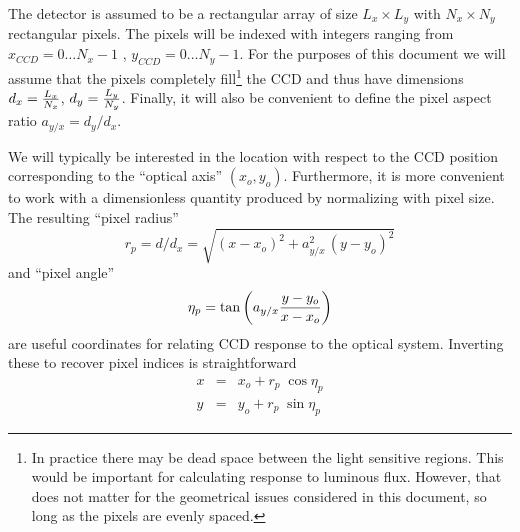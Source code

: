 \documentclass[11pt,twoside]{article}   %
\begin{document}
The detector is assumed to be a rectangular array of size $L_x
\times L_y$ with $N_x \times N_y$ rectangular pixels.  The pixels
will be indexed with integers ranging from $x_{CCD} = 0\ldots
N_x-1$ , $y_{CCD} = 0\ldots N_y-1$. For the purposes of this
document we will assume that the pixels completely
fill\footnote{
In practice there may be dead space between the light sensitive
regions.  This would be important for calculating response to
luminous flux.  However, that does not matter for the geometrical
issues considered in this document, so long as the pixels are
evenly spaced. }
the CCD and thus have dimensions $d_x={L_x \over N_x}$, $d_y= {L_y
\over N_y}$.  Finally, it will also be convenient to define the
pixel aspect ratio $a_{y/x} = {d_y / d_x}$.

We will typically be interested in the location with respect to
the CCD position corresponding to the ``optical axis''
$(x_o,y_o)$. Furthermore, it is more convenient to work with a
dimensionless quantity produced by normalizing with pixel size.
The resulting ``pixel radius''
 \begin{equation}
  r_p = d / d_x = \sqrt{ (x - x_o)^2 + a_{y/x}^2 \, (y - y_o)^2 }
  \label{eqn:pixelradius}
 \end{equation}
and ``pixel angle''
 \begin{equation}
  \eta_p = \tan \left( a_{y/x} {{y-y_o}\over{x-x_o}} \right)
  \label{eqn:pixelangle}
 \end{equation}
are useful coordinates for relating CCD response to the optical
system.  Inverting these to recover pixel indices is
straightforward
 \begin{eqnarray}
  x &=& x_o + r_p \; \cos\eta_p \\
  y &=& y_o + r_p \; \sin\eta_p
 \end{eqnarray}
\end{document}
